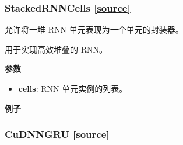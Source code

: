 \subsubsection{StackedRNNCells {\href{https://github.com/keras-team/keras/blob/master/keras/layers/recurrent.py\#L25}{{[}source{]}}}}

\begin{Shaded}
\begin{Highlighting}[]
\end{Highlighting}
\end{Shaded}

允许将一堆 RNN 单元表现为一个单元的封装器。

用于实现高效堆叠的 RNN。

\textbf{参数}

\begin{itemize}
\tightlist
\item
  \textbf{cells}: RNN 单元实例的列表。
\end{itemize}

\textbf{例子}

\begin{Shaded}
\begin{Highlighting}[]
\OperatorTok{=} \NormalTok{[}
\NormalTok{]}

\OperatorTok{=} 
\OperatorTok{=} 
\end{Highlighting}
\end{Shaded}




\subsubsection{CuDNNGRU {\href{https://github.com/keras-team/keras/blob/master/keras/layers/cudnn_recurrent.py\#L135}{{[}source{]}}}}

